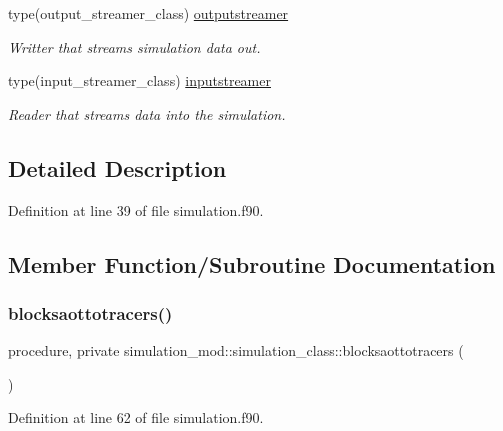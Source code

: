\begin{DoxyCompactItemize}
type(output\+\_\+streamer\+\_\+class) \mbox{\hyperlink{structsimulation__mod_1_1simulation__class_a75e838871eedd2fd66dc7d9bfce015ad}{outputstreamer}}
\begin{DoxyCompactList}\small\item\em Writter that streams simulation data out. \end{DoxyCompactList}\item 
type(input\+\_\+streamer\+\_\+class) \mbox{\hyperlink{structsimulation__mod_1_1simulation__class_a40add8001e631510e3530931b9a9d06a}{inputstreamer}}
\begin{DoxyCompactList}\small\item\em Reader that streams data into the simulation. \end{DoxyCompactList}\end{DoxyCompactItemize}


\subsection{Detailed Description}


Definition at line 39 of file simulation.\+f90.



\subsection{Member Function/\+Subroutine Documentation}
\mbox{\label{structsimulation__mod_1_1simulation__class_a76130621d9de5c88e1af063a21b4afa6}} 
\subsubsection{\texorpdfstring{blocksaottotracers()}{blocksaottotracers()}}
{\footnotesize\ttfamily procedure, private simulation\+\_\+mod\+::simulation\+\_\+class\+::blocksaottotracers (\begin{DoxyParamCaption}{ }\end{DoxyParamCaption})\hspace{0.3cm}{\ttfamily [private]}}



Definition at line 62 of file simulation.\+f90.

